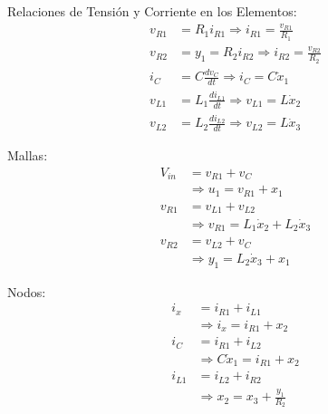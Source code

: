   Relaciones de Tensión y Corriente en los Elementos:
  \begin{align}
    v_{R1} &= R_1 i_{R1} \Rightarrow
    i_{R1} = \frac{v_{R1}}{R_1} \label{eq:1.1:3:vr1}
    \\
    v_{R2} &= y_1 = R_2 i_{R2} \Rightarrow
    i_{R2} = \frac{v_{R2}}{R_2} \label{eq:1.1:3:vr2}
    \\
    i_C &= C \frac{dv_{C}}{dt} \Rightarrow
    i_C =C\dot{x}_1 \label{eq:1.1:3:ic}
    \\
    v_{L1} &= L_1 \frac{di_{L1}}{dt} \Rightarrow
    v_{L1} = L\dot{x}_2 \label{eq:1.1:3:vl1}
    \\
    v_{L2} &= L_2 \frac{di_{L2}}{dt} \Rightarrow
    v_{L2} = L\dot{x}_3 \label{eq:1.1:3:vl2}
  \end{align}

  Mallas:
  \begin{align}
    \label{eq:1.1:3:Malla1}
    V_{in} &= v_{R1} + v_C \nonumber \\
    \tag{Malla 1}
    &\Rightarrow u_1 = v_{R1} + x_1
    \\
    \label{eq:1.1:3:Malla2}
    v_{R1} &= v_{L1} + v_{L2} \nonumber \\
    \tag{Malla 2}
    &\Rightarrow v_{R1} = L_1\dot{x}_2 + L_2\dot{x}_3
    \\
    \label{eq:1.1:3:Malla3}
    v_{R2} &= v_{L2} + v_C \nonumber \\
    \tag{Malla 3}
    &\Rightarrow y_1 = L_2\dot{x}_3 + x_1
  \end{align}

  Nodos:
  \begin{align}
    \label{eq:1.1:3:Nodo1}
    i_x &= i_{R1} + i_{L1} \nonumber \\
    \tag{Nodo 1}
    &\Rightarrow i_x = i_{R1} + x_2
    \\ \label{eq:1.1:3:Nodo2}
    i_C &= i_{R1} + i_{L2} \nonumber \\
    \tag{Nodo 2}
    &\Rightarrow C\dot{x}_1 = i_{R1} + x_2
    \\ \label{eq:1.1:3:Nodovx}
    i_{L1} &= i_{L2} + i_{R2} \nonumber \\
    \tag{Nodo $V_x$}
    &\Rightarrow x_2 = x_3 + \frac{y_1}{R_2}
  \end{align}
